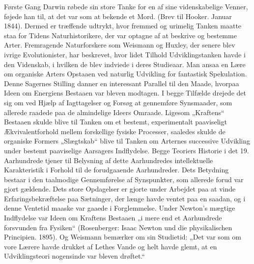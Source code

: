 \documentclass[12pt,a4paper,openany]{book}
\newcommand{\opage}[1]{\marginnote{\footnotesize\textit{[#1]}}}
\begin{document}
Første Gang Darwin røbede sin store Tanke for en af sine videnskabelige
Venner, føjede han til, at det var som at bekende et Mord.
(Brev til Hooker. Januar 1844). Dermed er træffende udtrykt, hvor
fremmed og urimelig Tanken maatte staa for Tidens Naturhistorikere,
der var optagne af at beskrive og bestemme Arter. Fremragende
Naturforskere som Weismann og Huxley, der senere blev ivrige
Evolutionister, har beskrevet, hvor lidet Tilhold Udviklingstanken
havde i den Videnskab, i hvilken de blev indviede i deres
Studieaar. Man ansaa en Lære om organiske Arters Opstaaen ved
naturlig Udvikling for fantastisk Spekulation. Denne Sagernes Stilling
danner en interessant Parallel til den Maade, hvorpaa Ideen
\opage{38}om Energiens Bestaaen var bleven modtagen. I begge Tilfælde drejede
det sig om ved Hjælp af Iagttagelser og Forsøg at gennemføre Synsmaader,
som allerede raadede paa de almindelige Ideers Omraade.
Ligesom „Kraftens“ Bestaaen skulde blive til Tanken om et bestemt,
experimentalt paaviseligt Ækvivalentforhold mellem forskellige fysiske
Processer, saaledes skulde de organiske Formers „Slægtskab“
blive til Tanken om Arternes successive Udvikling under bestemt
paaviselige Aarsagers Indflydelse. Begge Teoriers Historie i det 19.
Aarhundrede tjener til Belysning af dette Aarhundredes intellektuelle
Karakteristik i Forhold til de forudgaaende Aarhundreder. Dets
Betydning bestaar i den taalmodige Gennemførelse af Synspunkter,
som allerede forud var gjort gældende. Dets store Opdagelser er gjorte
under Arbejdet paa at vinde Erfaringsbekræftelse paa Sætninger,
der længe havde ventet paa en saadan, og i denne Ventetid maaske
var gaaede i Forglemmelse. Under Newton’s mægtige Indflydelse var
Ideen om Kraftens Bestaaen „i mere end et Aarhundrede forsvunden
fra Fysiken“ (Rosenberger: Isaac Newton und die physikalischen
Principien. 1895). Og Weismann bemærker om sin Studietid: „Det
var som om vore Lærere havde drukket af Lethes Vande og helt
havde glemt, at en Udviklingsteori nogensinde var bleven drøftet.“
\end{document}

